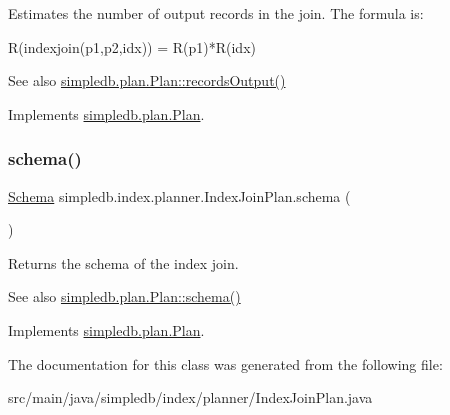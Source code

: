 Estimates the number of output records in the join. The formula is\+: 
\begin{DoxyPre} R(indexjoin(p1,p2,idx)) = R(p1)*R(idx) \end{DoxyPre}
 \begin{DoxySeeAlso}{See also}
\hyperlink{interfacesimpledb_1_1plan_1_1Plan_a187e06657d356c80a7f743d7ff8fd257}{simpledb.\+plan.\+Plan\+::records\+Output()} 
\end{DoxySeeAlso}


Implements \hyperlink{interfacesimpledb_1_1plan_1_1Plan_a187e06657d356c80a7f743d7ff8fd257}{simpledb.\+plan.\+Plan}.

\mbox{\label{classsimpledb_1_1index_1_1planner_1_1IndexJoinPlan_a4dcc700748306498294974d01a5f78fd}} 
\subsubsection{\texorpdfstring{schema()}{schema()}}
{\footnotesize\ttfamily \hyperlink{classsimpledb_1_1record_1_1Schema}{Schema} simpledb.\+index.\+planner.\+Index\+Join\+Plan.\+schema (\begin{DoxyParamCaption}{ }\end{DoxyParamCaption})\hspace{0.3cm}{\ttfamily [inline]}}

Returns the schema of the index join. \begin{DoxySeeAlso}{See also}
\hyperlink{interfacesimpledb_1_1plan_1_1Plan_ad0ee1aa2c4e7147e9f8fc6f3301fa986}{simpledb.\+plan.\+Plan\+::schema()} 
\end{DoxySeeAlso}


Implements \hyperlink{interfacesimpledb_1_1plan_1_1Plan_ad0ee1aa2c4e7147e9f8fc6f3301fa986}{simpledb.\+plan.\+Plan}.



The documentation for this class was generated from the following file\+:\begin{DoxyCompactItemize}
\item 
src/main/java/simpledb/index/planner/Index\+Join\+Plan.\+java\end{DoxyCompactItemize}
